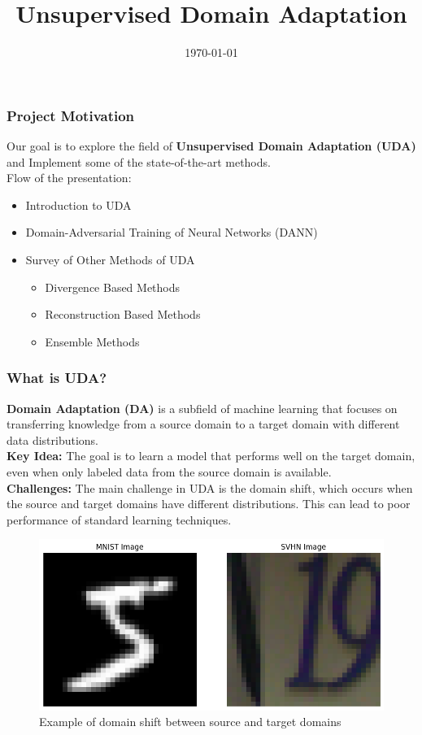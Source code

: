 \documentclass{beamer}
\title{Unsupervised Domain Adaptation}
\author{}
\institute{Indian Institute of Science, Bangalore}
\date{\today}
\begin{document}
\frame{\titlepage}

\begin{frame}
    \frametitle{Project Motivation}
    Our goal is to explore the field of \textbf{Unsupervised Domain Adaptation (UDA)} and Implement some of the state-of-the-art methods.\\
    Flow of the presentation:
    \begin{itemize}
        \item Introduction to UDA
        \item Domain-Adversarial Training of Neural Networks (DANN)
        \item Survey of Other Methods of UDA
        \begin{itemize}
            \item Divergence Based Methods
            \item Reconstruction Based Methods
            \item Ensemble Methods
        \end{itemize}
    \end{itemize}    

\end{frame}

\begin{frame}
    \frametitle{What is UDA?}
    \textbf{Domain Adaptation (DA)} is a subfield of machine learning that focuses on transferring knowledge from a source domain to a target domain with different data distributions.\\
    \textbf{Key Idea:} The goal is to learn a model that performs well on the target domain, even when only labeled data from the source domain is available.\\
    \textbf{Challenges:} The main challenge in UDA is the domain shift, which occurs when the source and target domains have different distributions. This can lead to poor performance of standard learning techniques.\\
    \begin{figure}
        \centering
        \includegraphics[width=0.5\linewidth]{Example of Domain Shift.png}
        \caption{Example of domain shift between source and target domains}
    \end{figure}
\end{frame}
\end{document}
